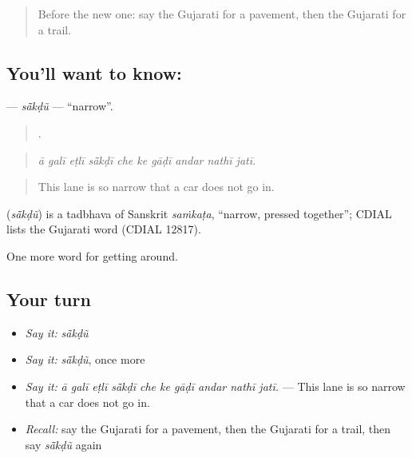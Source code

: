 \begin{quote}
Before the new one: say the Gujarati for a pavement, then the Gujarati for a trail.
\end{quote}

\subsection*{You'll want to know: }
\textbf{} — \emph{sā̃kḍũ} — \textquotedblleft{}narrow\textquotedblright{}.

\begin{quote}
         .
\end{quote}

\begin{quote}
\emph{ā galī eṭlī sā̃kḍī che ke gāḍī andar nathī jatī.}
\end{quote}

\begin{quote}
This lane is so narrow that a car does not go in.
\end{quote}

\begin{cousinweb}
\textbf{} (\emph{sā̃kḍũ}) is a tadbhava of Sanskrit \emph{saṁkaṭa}, \textquotedblleft{}narrow, pressed together\textquotedblright{}; CDIAL lists the Gujarati word (CDIAL 12817).
\end{cousinweb}

\begin{grammarlens}[title={What you've built}]
One more word for getting around.
\end{grammarlens}

\subsection*{Your turn}
\begin{itemize}
\raggedright
  \item \emph{Say it:} \emph{sā̃kḍũ}
  \item \emph{Say it:} \emph{sā̃kḍũ}, once more
  \item \emph{Say it:} \emph{ā galī eṭlī sā̃kḍī che ke gāḍī andar nathī jatī.} — This lane is so narrow that a car does not go in.
  \item \emph{Recall:} say the Gujarati for a pavement, then the Gujarati for a trail, then say \emph{sā̃kḍũ} again
\end{itemize}


